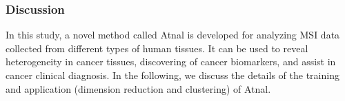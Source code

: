 \documentclass[journal=jacsat,manuscript=article]{achemso}
\begin{document}
\subsubsection{Discussion}
In this study, a novel method called Atnal is developed 
for analyzing MSI data collected from different types of 
human tissues. It can be used to reveal heterogeneity in cancer 
tissues, discovering of 
cancer biomarkers, and assist in cancer clinical diagnosis.
In the following, we discuss the details of the training and application 
(dimension reduction and clustering) of Atnal.
\begin{figure}[htbp]
  \centering
  \begin{minipage}{0.46\textwidth}
  \end{minipage}
  \begin{minipage}{0.51\textwidth}
\end{minipage}
\end{figure}
\end{document}
